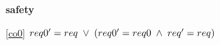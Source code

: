 \textbf{safety}
\begin{block}
\item[ \eqref{co0} ]{$req0' = req \; \lor \; (req0' = req0 \; \land \; req' = req)$} %
\end{block}
